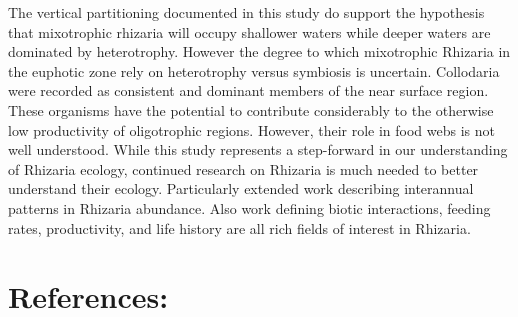 \documentclass[
]{article}
\begin{document}
The vertical partitioning documented in this study do support the
hypothesis that mixotrophic rhizaria will occupy shallower waters while
deeper waters are dominated by heterotrophy. However the degree to which
mixotrophic Rhizaria in the euphotic zone rely on heterotrophy versus
symbiosis is uncertain. Collodaria were recorded as consistent and
dominant members of the near surface region. These organisms have the
potential to contribute considerably to the otherwise low productivity
of oligotrophic regions. However, their role in food webs is not well
understood. While this study represents a step-forward in our
understanding of Rhizaria ecology, continued research on Rhizaria is
much needed to better understand their ecology. Particularly extended
work describing interannual patterns in Rhizaria abundance. Also work
defining biotic interactions, feeding rates, productivity, and life
history are all rich fields of interest in Rhizaria.

\section{References:}\label{references}
\end{document}
